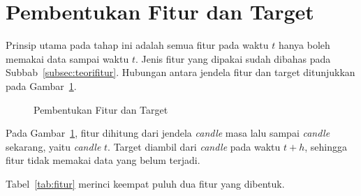 \section{Pembentukan Fitur dan Target}
\label{sec:fitur}
Prinsip utama pada tahap ini adalah semua fitur pada waktu $t$ hanya boleh
memakai data sampai waktu $t$. Jenis fitur yang dipakai sudah dibahas pada
Subbab~\ref{subsec:teorifitur}. Hubungan antara jendela fitur dan target ditunjukkan pada Gambar~\ref{fig:fitur}.

\begin{figure}[!htbp]
  \centering
  \caption{Pembentukan Fitur dan Target}
  \label{fig:fitur}
\end{figure}
Pada Gambar~\ref{fig:fitur}, fitur dihitung dari jendela \textit{candle} masa
lalu sampai \textit{candle} sekarang, yaitu \textit{candle} $t$. Target diambil
dari \textit{candle} pada waktu $t+h$,
sehingga fitur tidak memakai data yang belum terjadi.

Tabel~\ref{tab:fitur} merinci keempat puluh dua fitur yang dibentuk.

